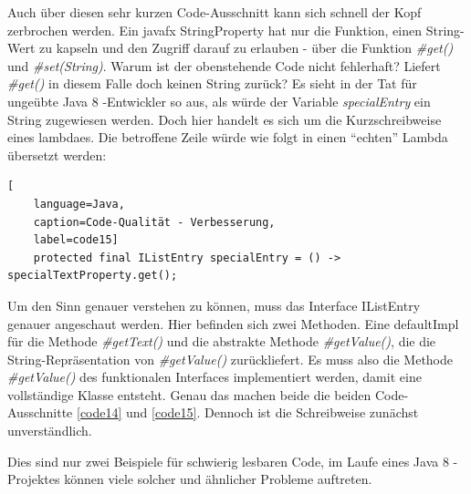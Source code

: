Auch über diesen sehr kurzen Code-Ausschnitt kann sich schnell der Kopf zerbrochen werden. Ein \gls{javafx} StringProperty hat nur die Funktion, einen String-Wert zu kapseln und den Zugriff darauf zu erlauben - über die Funktion \textit{\#get()} und \textit{\#set(String)}. Warum ist der obenstehende Code nicht fehlerhaft? Liefert \textit{\#get()} in diesem Falle doch keinen String zurück?
Es sieht in der Tat für ungeübte Java 8 -Entwickler so aus, als würde der Variable \textit{specialEntry} ein String zugewiesen werden. Doch hier handelt es sich um die Kurzschreibweise eines \gls{lambda}es. Die betroffene Zeile würde wie folgt in einen \enquote{echten} Lambda übersetzt werden:

\begin{lstlisting}[
    language=Java,
    caption=Code-Qualität - Verbesserung,
    label=code15]
	protected final IListEntry specialEntry = () -> specialTextProperty.get();
\end{lstlisting}

Um den Sinn genauer verstehen zu können, muss das Interface IListEntry genauer angeschaut werden. Hier befinden sich zwei Methoden. Eine \gls{defaultImpl} für die Methode \textit{\#getText()} und die abstrakte Methode \textit{\#getValue()}, die die String-Repräsentation von \textit{\#getValue()} zurückliefert. Es muss also die Methode \textit{\#getValue()} des funktionalen Interfaces implementiert werden, damit eine vollständige Klasse entsteht. Genau das machen beide die beiden Code-Ausschnitte \ref{code14} und \ref{code15}. Dennoch ist die Schreibweise zunächst unverständlich.

Dies sind nur zwei Beispiele für schwierig lesbaren Code, im Laufe eines Java 8 -Projektes können viele solcher und ähnlicher Probleme auftreten.